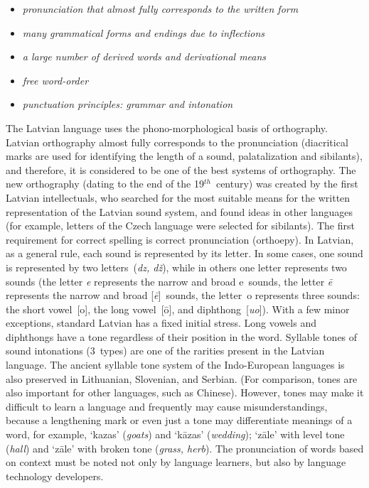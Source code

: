 \begin{multicols}{2}
\begin{itemize}
\item  \textit{pronunciation that almost fully corresponds to the written form}
\item \textit{ many grammatical forms and endings due to inflections }
\item \textit{ a large number of derived words and derivational means}
\item \textit{ free word-order}
\item \textit{ punctuation principles: grammar and intonation}
\end{itemize}
The Latvian language uses the phono-morphological basis of orthography.
Latvian orthography almost fully corresponds to the pronunciation (diacritical marks are used for identifying the length of a sound, palatalization and sibilants), and therefore, it is considered to be one of the best systems of orthography.
The new orthography (dating to the end of the 19${}^{th}$~century) was created by the first Latvian intellectuals, who searched for the most suitable means for the written representation of the Latvian sound system, and found ideas in other languages (for example, letters of the Czech language were selected for sibilants).
The first requirement for correct spelling is correct pronunciation (orthoepy).
In Latvian, as a general rule, each sound is represented by its letter.
In some cases, one sound is represented by two letters~(\textit{dz, dž}), while in others one letter represents two sounds (the letter \textit{e} represents the narrow and broad e~sounds, the letter \textit{ē} represents the narrow and broad [\textit{ē}]~sounds, the letter~o represents three sounds: the short vowel~[o], the long vowel~[ō], and diphthong~[\textit{uo}]).
With a few minor exceptions, standard Latvian has a fixed initial stress.
Long vowels and diphthongs have a tone regardless of their position in the word.
Syllable tones of sound intonations (3~types) are one of the rarities present in the Latvian language.
The ancient syllable tone system of the Indo-European languages is also preserved in Lithuanian, Slovenian, and Serbian.
(For comparison, tones are also important for other languages, such as Chinese).
However, tones may make it difficult to learn a language and frequently may cause misunderstandings, because a lengthening mark or even just a tone may differentiate meanings of a word, for example, `kazas' (\textit{goats}) and `kāzas' (\textit{wedding}); `zāle' with level tone (\textit{hall}) and `zāle' with broken tone (\textit{grass, herb}).
The pronunciation of words based on context must be noted not only by language learners, but also by language technology developers.


\end{multicols}
